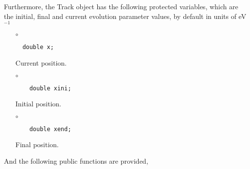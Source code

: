 Furthermore, the {\ttf Track} object has the following protected
variables, which are the initial, final and current
evolution parameter values, by default in units of eV$^{-1}$
%
%
\begin{itemize}
\item[$\circ$]  
  \begin{lstlisting}
  double x;
  \end{lstlisting}
  Current position.
\item[$\circ$]  
  \begin{lstlisting}
    double xini;
  \end{lstlisting}
  Initial position.
\item[$\circ$]  
  \begin{lstlisting}
    double xend;
  \end{lstlisting}
  Final position.
\end{itemize}
%
And the following public functions are provided,
%

